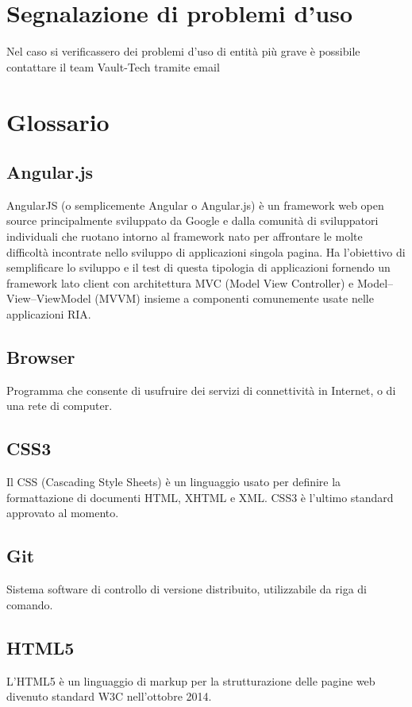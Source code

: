 \documentclass[a4paper, titlepage]{article}
\begin{document}
	\section{Segnalazione di problemi d'uso}
	Nel caso si verificassero dei problemi d'uso di entità più grave è possibile contattare il team Vault-Tech tramite email 
	
	
	\newpage
	\appendix
	
	\section{Glossario}
	\label{gl} 
	
	\subsection{Angular.js}
	AngularJS (o semplicemente Angular o Angular.js) è un framework web open source principalmente sviluppato da Google e dalla comunità di sviluppatori individuali che ruotano intorno al framework nato per affrontare le molte difficoltà incontrate nello sviluppo di applicazioni singola pagina. Ha l'obiettivo di semplificare lo sviluppo e il test di questa tipologia di applicazioni fornendo un framework lato client con architettura MVC (Model View Controller) e Model–View–ViewModel (MVVM) insieme a componenti comunemente usate nelle applicazioni RIA.
	
	\subsection{Browser}
	Programma che consente di usufruire dei servizi di connettività in Internet, o di una rete di computer.
	
	\subsection{CSS3}
	Il CSS (Cascading Style Sheets) è un linguaggio usato per definire la formattazione di documenti HTML, XHTML e XML. CSS3 è l’ultimo standard approvato al momento.
	
	\subsection{Git}
	Sistema software di controllo di versione distribuito, utilizzabile da riga di comando.
	
	\subsection{HTML5}
	L’HTML5 è un linguaggio di markup per la strutturazione delle pagine web divenuto standard W3C nell’ottobre 2014.
	
\end{document}

